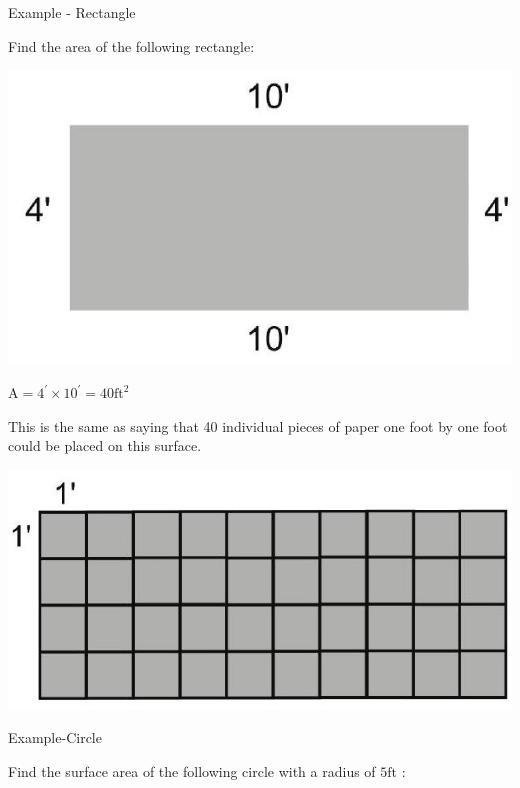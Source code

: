 \documentclass[10pt]{article}
\begin{document}
Example - Rectangle

Find the area of the following rectangle:

\includegraphics[max width=\textwidth]{2022_09_11_72dbedc910e6e984560cg-27(1)}

$\mathrm{A}=4^{\prime} \times 10^{\prime}=40 \mathrm{ft}^{2}$

This is the same as saying that 40 individual pieces of paper one foot by one foot could be placed on this surface.

\includegraphics[max width=\textwidth]{2022_09_11_72dbedc910e6e984560cg-27(2)}

Example-Circle

Find the surface area of the following circle with a radius of $5 \mathrm{ft}$ :
\end{document}
